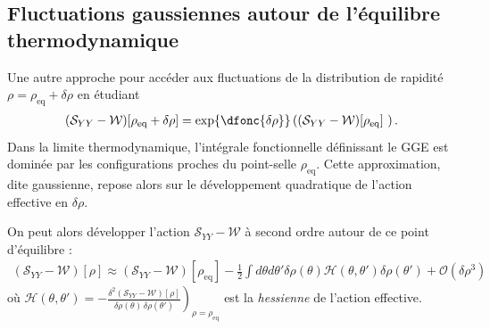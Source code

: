 \subsection{Fluctuations gaussiennes autour de l’équilibre thermodynamique}

Une autre approche pour accéder aux fluctuations de la distribution de rapidité $\rho = \rho_{\mathrm{eq}} + \delta \rho $  en étudiant 
\begin{eqnarray*}
	(\mathcal{S}_{YY} - \mathcal{W})[\rho_{\mathrm{eq}} + \delta \rho ]  = \exp \{\dfonc{\delta \rho }\}\left ( (\mathcal{S}_{YY} - \mathcal{W})[\rho_{\mathrm{eq}}] \right ).	
\end{eqnarray*}
Dans la limite thermodynamique, l’intégrale fonctionnelle définissant le \gls{GGE} est dominée par les configurations proches du point-selle $\rho_{\mathrm{eq}}$. Cette approximation, dite gaussienne, repose alors sur le développement quadratique de l’action effective en $\delta \rho$.

\smallskip

On peut alors développer l’action $\mathcal{S}_{YY} - \mathcal{W}$ à second ordre autour de ce point d'équilibre :
\begin{eqnarray}
	(\mathcal{S}_{YY} - \mathcal{W})[\rho] \approx (\mathcal{S}_{YY} - \mathcal{W})[\rho_{\mathrm{eq}}]   - \frac{1}{2} \int d\theta d \theta' \delta \rho(\theta) \mathcal{H}(\theta, \theta' )\delta \rho(\theta') + \mathcal{O}(\delta \rho^3) 
\end{eqnarray}
où
\(
\displaystyle \mathcal{H}(\theta, \theta' ) = -\left.\frac{\delta^{2}(\mathcal{S}_{YY}-\mathcal{W})[\rho]}{\delta\rho(\theta)\,\delta\rho(\theta')}\right)_{\rho = \rho_{\mathrm{eq}}}
\)
est la \textit{hessienne} de l’action effective.

